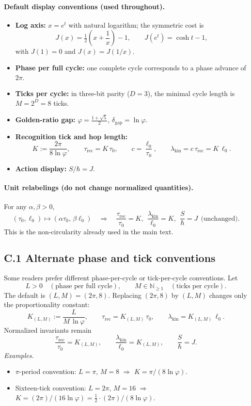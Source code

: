 \documentclass[11pt]{article}
\theoremstyle{plain}
\theoremstyle{definition}
\theoremstyle{remark}
\begin{document}
\paragraph{Default display conventions (used throughout).}
\begin{itemize}
  \item \textbf{Log axis:} \(x=e^{t}\) with natural logarithm; the symmetric cost is
  \[
  J(x)=\tfrac12\!\left(x+\frac{1}{x}\right)-1,\qquad J(e^{t})=\cosh t-1,
  \]
  with \(J(1)=0\) and \(J(x)=J(1/x)\).
  \item \textbf{Phase per full cycle:} one complete cycle corresponds to a phase advance of \(2\pi\).
  \item \textbf{Ticks per cycle:} in three-bit parity (\(D=3\)), the minimal cycle length is \(M=2^{D}=8\) ticks.
  \item \textbf{Golden-ratio gap:} \(\varphi=\tfrac{1+\sqrt5}{2}\), \(\delta_{\mathrm{gap}}=\ln\varphi\).
  \item \textbf{Recognition tick and hop length:}
  \[
  K:=\frac{2\pi}{8\ln\varphi},\qquad
  \tau_{\mathrm{rec}}=K\,\tau_{0},\qquad
  c=\frac{\ell_{0}}{\tau_{0}},\qquad
  \lambda_{\mathrm{kin}}=c\,\tau_{\mathrm{rec}}=K\,\ell_{0}.
  \]
  \item \textbf{Action display:} \(S/\hbar=J\).
\end{itemize}

\paragraph{Unit relabelings (do not change normalized quantities).}
For any \(\alpha,\beta>0\),
\[
(\tau_{0},\ell_{0})\mapsto(\alpha\tau_{0},\,\beta\ell_{0})\quad\Rightarrow\quad
\frac{\tau_{\mathrm{rec}}}{\tau_{0}}=K,\ \ \frac{\lambda_{\mathrm{kin}}}{\ell_{0}}=K,\ \ \frac{S}{\hbar}=J
\ \ \text{(unchanged)}.
\]
This is the non-circularity already used in the main text.

\subsection*{C.1 Alternate phase and tick conventions}
Some readers prefer different phase-per-cycle or tick-per-cycle conventions. Let
\[
L>0\quad(\text{phase per full cycle}),\qquad M\in\mathbb{N}_{\ge 1}\quad(\text{ticks per cycle}).
\]
The default is \((L,M)=(2\pi,8)\). Replacing \((2\pi,8)\) by \((L,M)\) changes only the proportionality constant:
\[
K_{(L,M)}:=\frac{L}{M\,\ln\varphi},\qquad
\tau_{\mathrm{rec}}=K_{(L,M)}\,\tau_{0},\qquad
\lambda_{\mathrm{kin}}=K_{(L,M)}\,\ell_{0}.
\]
Normalized invariants remain
\[
\frac{\tau_{\mathrm{rec}}}{\tau_{0}}=K_{(L,M)},\qquad
\frac{\lambda_{\mathrm{kin}}}{\ell_{0}}=K_{(L,M)},\qquad
\frac{S}{\hbar}=J.
\]
\emph{Examples.}
\begin{itemize}
  \item \(\pi\)-period convention: \(L=\pi\), \(M=8\) \(\Rightarrow\) \(K=\pi/(8\ln\varphi)\).
  \item Sixteen-tick convention: \(L=2\pi\), \(M=16\) \(\Rightarrow\) \(K=(2\pi)/(16\ln\varphi)=\tfrac12\cdot (2\pi)/(8\ln\varphi)\).
\end{itemize}
\end{document}
